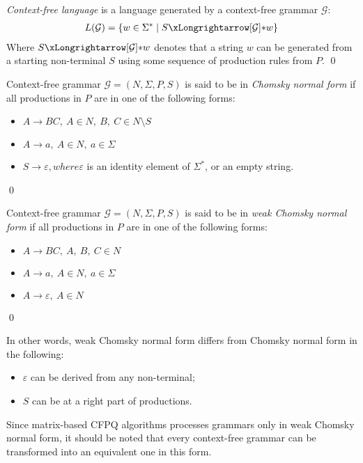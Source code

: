 \begin{definition} \emph{Context-free language} is a language generated by a context-free grammar $\mathcal{G}$:
\begin{align*}
     L(\mathcal{G}) = \{w \in \Sigma^* \mid S \xLongrightarrow[\mathcal{G}]{*} w \} 
\end{align*}
Where $S \xLongrightarrow[\mathcal{G}]{*} w$  denotes that a string $w$ can be generated from a starting non-terminal $S$ using some sequence of production rules from $P$. \qed
\end{definition}

\begin{definition} Context-free grammar $\mathcal{G} = (N, \Sigma, P, S)$ is said to be in \emph{Chomsky normal form} if all productions in $P$ are in one of the following forms:
    \begin{itemize}
        \item $A \rightarrow BC,~A \in N,~B,~C \in N \setminus S$
        \item  $A \rightarrow a,~A \in N,~a \in \Sigma$
        \item $S \rightarrow \varepsilon, where \varepsilon$ is an identity element of $\Sigma^*$, or an empty string.
    \end{itemize}\qed
\end{definition}

\begin{definition} Context-free grammar $\mathcal{G} = (N, \Sigma, P, S)$ is said to be in \emph{weak Chomsky normal form} if all productions in $P$ are in one of the following forms:
    \begin{itemize}
        \item $A \rightarrow BC,~A,~B,~C \in N$
        \item  $A \rightarrow a,~A \in N,~a \in \Sigma$
        \item $A \rightarrow \varepsilon,~A \in N$
    \end{itemize} \qed
\end{definition}

In other words, weak Chomsky normal form differs from Chomsky normal form in the following:
\begin{itemize}
    \item $\varepsilon$ can be derived from any non-terminal;
    \item $S$ can be at a right part of productions.
\end{itemize}

Since matrix-based CFPQ algorithms processes grammars only in weak Chomsky normal form, it should be noted that every context-free grammar can be transformed into an equivalent one in this form. 

